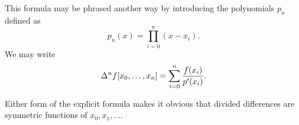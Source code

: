\documentclass[12pt]{article}
\begin{document}
This formula may be phrased another way by introducing the polynomials $p_n$ defined as
\[
p_n (x) = \prod_{i = 0}^n (x - x_i).
\]
We may write
\[
\Delta^n f [x_0, \ldots ,x_n] = \sum_{i=0}^n {f(x_i) \over p'(x_i)}.
\]

Either form of the explicit formula makes it obvious that divided differences 
are symmetric functions of $x_0, x_1, \ldots$.
\end{document}
